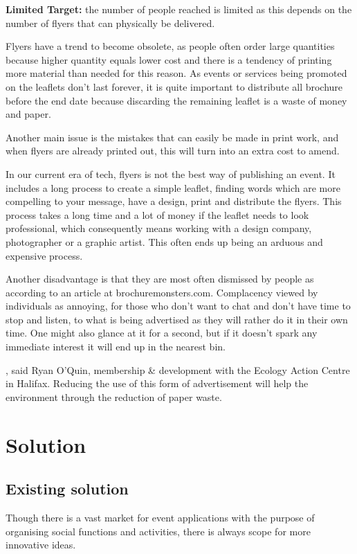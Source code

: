 \textbf{Limited Target:} the number of people reached is limited as this depends on the number of flyers that can physically be delivered. 

Flyers have a trend to become obsolete, as people often order large quantities because  higher quantity equals lower cost and there is a tendency of printing more material than needed for this reason. As events or services being promoted on the leaflets don’t last forever, it is quite important to distribute all brochure before the end date because discarding the remaining leaflet is a waste of money and paper.

Another main issue is the mistakes that can easily be made in print work, and when flyers are already printed out, this will turn into an extra cost to amend.

In our current era of tech, flyers is not the best way of publishing an event. It includes a long process to create a simple leaflet, finding words which are more compelling to your message, have a design, print and distribute the flyers. This process takes a long time and a lot of money if the leaflet needs to look professional, which consequently means working with a design company, photographer or a graphic artist. This often ends up being an arduous and expensive process.

Another disadvantage is that they are most often dismissed by people as  according to an article at brochuremonsters.com. Complacency viewed by individuals as annoying, for those who don’t want to chat and don’t have time to stop and listen, to what is being advertised as they will rather do it in their own time. One might also glance at it for a second, but if it doesn’t spark any immediate interest it will end up in the nearest bin.

, said Ryan O’Quin, membership \& development with the Ecology Action Centre in Halifax. Reducing the use of this form of advertisement will help the environment through the reduction of paper waste. 

\section{Solution}
\subsection{Existing solution}
 Though there is a vast market for event applications with the purpose of organising social functions and activities, there is always scope for more innovative ideas.

